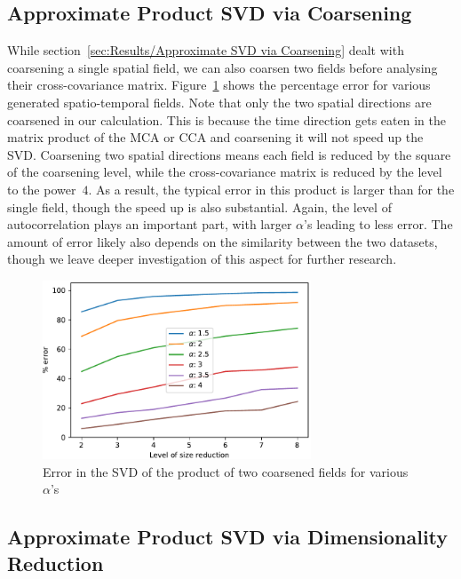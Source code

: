 \documentclass[ijgi,article,submit,moreauthors,pdftex,10pt,a4paper]{Definitions/mdpi}
\begin{document}
\subsection{Approximate Product SVD via Coarsening}
\label{sec:Results/Approximate Product SVD via Coarsening}

While section~\ref{sec:Results/Approximate SVD via Coarsening} dealt with coarsening a single spatial field, we can also coarsen two fields before analysing their cross-covariance matrix. Figure~\ref{fig:plotProductSpatialTemporalFieldsViaCoarsening} shows the percentage error for various generated spatio-temporal fields. Note that only the two spatial directions are coarsened in our calculation. This is because the time direction gets eaten in the matrix product of the MCA or CCA and coarsening it will not speed up the SVD. Coarsening two spatial directions means each field is reduced by the square of the coarsening level, while the cross-covariance matrix is reduced by the level to the power~$4$. As a result, the typical error in this product is larger than for the single field, though the speed up is also substantial. Again, the level of autocorrelation plays an important part, with larger $\alpha$'s leading to less error. The amount of error likely also depends on the similarity between the two datasets, though we leave deeper investigation of this aspect for further research. 

\begin{figure}[H]
\centering
\includegraphics[width=80mm]{Results/plotProductSpatialTemporalFieldsViaCoarsening.pdf}
\caption[Error after coarsening]{Error in the SVD of the product of two coarsened fields for various $\alpha$'s}
\label{fig:plotProductSpatialTemporalFieldsViaCoarsening}
\end{figure}

\subsection{Approximate Product SVD via Dimensionality Reduction}
\label{sec:Results/Approximate Product SVD via Dimensionality Reduction}
\end{document}
